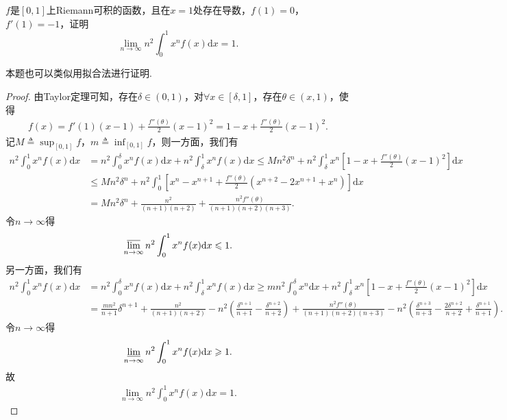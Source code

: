 \documentclass[../../main.tex]{subfiles}%
\begin{document}
\begin{example}
$f$是$[0,1]$上Riemann可积的函数，且在$x=1$处存在导数，$f(1)=0$，$f'(1)=-1$，证明$$\lim\limits_{n \to \infty} n^2 \int_0^1 x^n f(x) \mathrm{d}x = 1.$$
\end{example}
\begin{note}
本题也可以类似用拟合法进行证明.
\end{note}
\begin{proof}

由Taylor定理可知，存在$\delta \in (0,1)$，对$\forall x\in [\delta,1]$，存在$\theta \in (x,1)$，使得
\begin{align*}
f(x) = f'(1)(x-1) + \frac{f''(\theta)}{2}(x-1)^2 = 1 - x + \frac{f''(\theta)}{2}(x-1)^2.
\end{align*}
记$M \triangleq \sup_{[0,1]}f$，$m \triangleq \inf_{[0,1]}f$，则一方面，我们有
\begin{align*}
n^2\int_0^1 x^n f(x) \mathrm{d}x &= n^2\int_0^\delta x^n f(x) \mathrm{d}x + n^2\int_\delta^1 x^n f(x) \mathrm{d}x \leqslant Mn^2\delta^n + n^2\int_\delta^1 x^n \left[1 - x + \frac{f''(\theta)}{2}(x - 1)^2\right] \mathrm{d}x \\
&\leqslant Mn^2\delta^n + n^2\int_0^1 \left[x^n - x^{n+1} + \frac{f''(\theta)}{2}(x^{n+2} - 2x^{n+1} + x^n)\right] \mathrm{d}x \\
&= Mn^2\delta^n + \frac{n^2}{(n+1)(n+2)} + \frac{n^2 f''(\theta)}{(n+1)(n+2)(n+3)}.
\end{align*}
令$n \to \infty$得
\begin{align*}
\varlimsup_{n \to \infty} n^2\int_0^1 x^n f(x) \mathrm{d}x \leqslant 1.
\end{align*}
另一方面，我们有
\begin{align*}
n^2\int_0^1 x^n f(x) \mathrm{d}x &= n^2\int_0^\delta x^n f(x) \mathrm{d}x + n^2\int_\delta^1 x^n f(x) \mathrm{d}x \geqslant mn^2\int_0^{\delta}{x^n\mathrm{d}x} + n^2\int_\delta^1 x^n \left[1 - x + \frac{f''(\theta)}{2}(x - 1)^2\right] \mathrm{d}x \\
&= \frac{mn^2}{n+1}\delta ^{n+1} + \frac{n^2}{(n+1)(n+2)} - n^2\left(\frac{\delta^{n+1}}{n+1} - \frac{\delta^{n+2}}{n+2}\right) + \frac{n^2 f''(\theta)}{(n+1)(n+2)(n+3)} - n^2\left(\frac{\delta^{n+3}}{n+3} - \frac{2\delta^{n+2}}{n+2} + \frac{\delta^{n+1}}{n+1}\right).
\end{align*}
令$n \to \infty$得
\begin{align*}
\varliminf_{n \to \infty} n^2\int_0^1 x^n f(x) \mathrm{d}x \geqslant 1.
\end{align*}
故
\begin{align*}
\lim_{n \to \infty} n^2\int_0^1 x^n f(x) \mathrm{d}x = 1.
\end{align*}

\end{proof}
\end{document}
